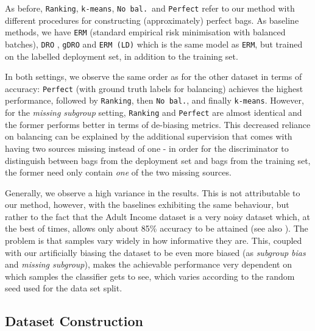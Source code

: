 As before, \texttt{Ranking}, \texttt{k-means}, \texttt{No bal.}\ and \texttt{Perfect} refer to our method with different procedures for constructing (approximately) perfect bags.
As baseline methods, we have \texttt{ERM} (standard empirical risk minimisation with balanced batches), \texttt{DRO} \citep{HasSriNamLia18}, \texttt{gDRO} \citep{sagawa2019distributionally}
and \texttt{ERM (LD)} which is the same model as \texttt{ERM}, but trained on the labelled deployment set, in addition to the training set.

In both settings, we observe the same order as for the other dataset in terms of accuracy: \texttt{Perfect} (with ground truth labels for balancing) achieves the highest performance, followed by \texttt{Ranking}, then \texttt{No bal.}, and finally \texttt{k-means}.
However, for the \emph{missing subgroup} setting, \texttt{Ranking} and \texttt{Perfect} are almost identical and the former performs better in terms of de-biasing metrics.
This decreased reliance on balancing can be explained by the additional supervision that comes with having two sources missing instead of one - in order for the discriminator to distinguish between bags from the deployment set and bags from the training set, the former need only contain \emph{one} of the two missing sources.

Generally, we observe a high variance in the results. This is not attributable to our method, however, with the baselines exhibiting the same behaviour, but rather to the fact that the Adult Income dataset is a very noisy dataset which, at the best of times, allows only about 85\% accuracy to be attained (see also \cite{agrawal2020debiasing}). The problem is that samples vary widely in how informative they are. This, coupled with our artificially biasing the dataset to be even more biased (as \emph{subgroup bias} and \emph{missing subgroup}), makes the achievable performance very dependent on which samples the classifier gets to see, which varies according to the random seed used for the data set split.

\subsection{Dataset Construction}\label{sec:dataset-construction}


